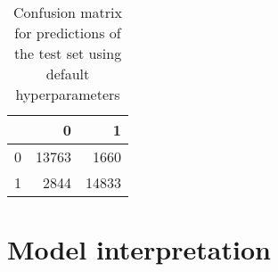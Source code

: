 \documentclass{article}
\begin{document}
\begin{itemize}
\begin{table}[h!]
\centering
\begin{tabular}{lrr}
\toprule
{} &      0 &      1 \\
\midrule
0 &  13763 &   1660 \\
1 &   2844 &  14833 \\
\bottomrule
\end{tabular}
\caption{Confusion matrix for predictions of the test set using default hyperparameters}
\label{table:model_te_cm}
\end{table}

\end{itemize}

\section{Model interpretation}
\label{sec:interp}
\end{document}
